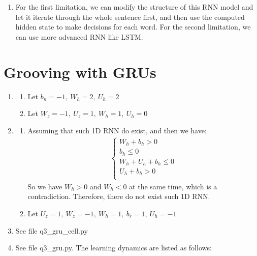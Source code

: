\documentclass[10pt, a4paper]{ctexart}
\begin{document}
\begin{enumerate}
{\begin{enumerate}
            \item For the first limitation, we can modify the structure of this RNN model and let it iterate through the whole sentence first, and then use the computed hidden state to make decisions for each word. For the second limitation, we can use more advanced RNN like LSTM.
        \end{enumerate}
    }
\end{enumerate}

\section{Grooving with GRUs}
\begin{enumerate}
    \item {
        \begin{enumerate}
            \item Let $b_n=-1,~W_h=2,~U_h=2$
            \item Let $W_z=-1,~U_z=1,~W_h=1,~U_h=0$
        \end{enumerate}
    }
    \item {
        \begin{enumerate}
            \item Assuming that such 1D RNN do exist, and then we have: {
                \begin{align*}
                    \left\{
                        \begin{matrix}
                            W_h+b_h>0\\
                            b_h\le 0\\
                            W_h+U_h+b_h\le 0\\
                            U_h+b_h>0\\
                        \end{matrix}
                        \right.
                \end{align*}
                } So we have $W_h>0$ and $W_h<0$ at the same time, which is a contradiction. Therefore, there do not exist such 1D RNN.
            \item Let $U_z=1,~W_z=-1,~W_h=1,~b_r=1,~U_h=-1$
        \end{enumerate}
    }
    \item See file q3\_gru\_cell.py
    \item See file q3\_gru.py. The learning dynamics are listed as follows: {
        \begin{figure}[H]
            \centering

\end{figure}}
\end{enumerate}
\end{document}
